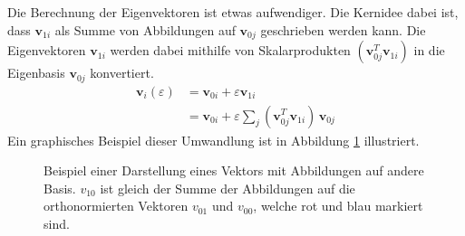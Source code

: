 Die Berechnung der Eigenvektoren ist etwas aufwendiger.
Die Kernidee dabei ist, dass $\bm v_{1i}$ als Summe von Abbildungen auf $\bm v_{0j}$ geschrieben werden kann.
Die Eigenvektoren $\bm v_{1i}$ werden dabei mithilfe von Skalarprodukten $( \bm v_{0j}^T \bm v_{1i})$ in die Eigenbasis $\bm v_{0j}$ konvertiert. %
\begin{align}
    \bm v_i(\varepsilon)
    &=
    \bm v_{0i} + \varepsilon \bm v_{1i} \\
    &=
    \bm v_{0i} + \varepsilon \sum_{j} \left( \bm v_{0j}^T \bm v_{1i} \right) \, \bm v_{0j}
\end{align}
Ein graphisches Beispiel dieser Umwandlung ist in Abbildung \ref{ew:fig:scalar_prod} illustriert.
\begin{figure}
    \begin{center}
        
    \end{center}
    \caption[Eigenräume]{
        Beispiel einer Darstellung eines Vektors mit Abbildungen auf andere Basis.
        $v_{10}$ ist gleich der Summe der Abbildungen auf die orthonormierten Vektoren $v_{01}$ und $v_{00}$, welche rot und blau markiert sind.
    } \label{ew:fig:scalar_prod}
\end{figure}

